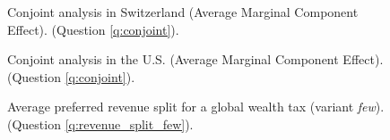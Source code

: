 \begin{figure}[h!]
    \caption[Conjoint analysis in Switzerland]{Conjoint analysis in Switzerland (Average Marginal Component Effect). (Question \ref{q:conjoint}).
    }\label{fig:conjoint_CH}
\end{figure} %

\begin{figure}[h!]
    \caption[Conjoint analysis in the U.S.]{Conjoint analysis in the U.S. (Average Marginal Component Effect). (Question \ref{q:conjoint}).
    }\label{fig:conjoint_US}
\end{figure} 

%
\begin{figure}[h!]
    \caption[Average preferred revenue split (\textit{few})]{Average preferred revenue split for a global wealth tax (variant \textit{few}). (Question \ref{q:revenue_split_few}).
    }\label{fig:split_few_bars_nb0}
\end{figure}

